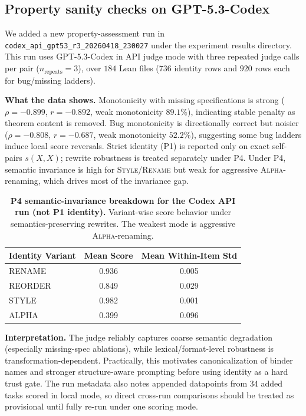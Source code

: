 \documentclass{article}
\begin{document}
\subsection{Property sanity checks on GPT-5.3-Codex}
We added a new property-assessment run in
\texttt{codex\_api\_gpt53\_r3\_20260418\_230027} under the experiment results directory.
This run uses GPT-5.3-Codex in API judge mode with three repeated judge calls per pair (\(n_\text{repeats}=3\)), over \(184\) Lean files (\(736\) identity rows and \(920\) rows each for bug/missing ladders).

\textbf{What the data shows.}
Monotonicity with missing specifications is strong (\(\rho=-0.899\), \(r=-0.892\), weak monotonicity \(89.1\%\)), indicating stable penalty as theorem content is removed.
Bug monotonicity is directionally correct but noisier (\(\rho=-0.808\), \(r=-0.687\), weak monotonicity \(52.2\%\)), suggesting some bug ladders induce local score reversals.
Strict identity (P1) is reported only on exact self-pairs \(s(X,X)\); rewrite robustness is treated separately under P4.
Under P4, semantic invariance is high for \textsc{Style}/\textsc{Rename} but weak for aggressive \textsc{Alpha}-renaming, which drives most of the invariance gap.

\begin{table}[t]
  \centering
  \small
  \begin{tabular}{lcc}
    \toprule
    \textbf{Identity Variant} & \textbf{Mean Score} & \textbf{Mean Within-Item Std} \\
    \midrule
    RENAME                    & 0.936               & 0.005                         \\
    REORDER                   & 0.849               & 0.029                         \\
    STYLE                     & 0.982               & 0.001                         \\
    ALPHA                     & 0.399               & 0.096                         \\
    \bottomrule
  \end{tabular}
  \caption{\textbf{P4 semantic-invariance breakdown for the Codex API run (not P1 identity).}
    Variant-wise score behavior under semantics-preserving rewrites. The weakest mode is aggressive \textsc{Alpha}-renaming.}
  \label{tab:codex_invariance_variants}
\end{table}

\textbf{Interpretation.}
The judge reliably captures coarse semantic degradation (especially missing-spec ablations), while lexical/format-level robustness is transformation-dependent.
Practically, this motivates canonicalization of binder names and stronger structure-aware prompting before using identity as a hard trust gate.
The run metadata also notes appended datapoints from 34 added tasks scored in local mode, so direct cross-run comparisons should be treated as provisional until fully re-run under one scoring mode.
\end{document}
